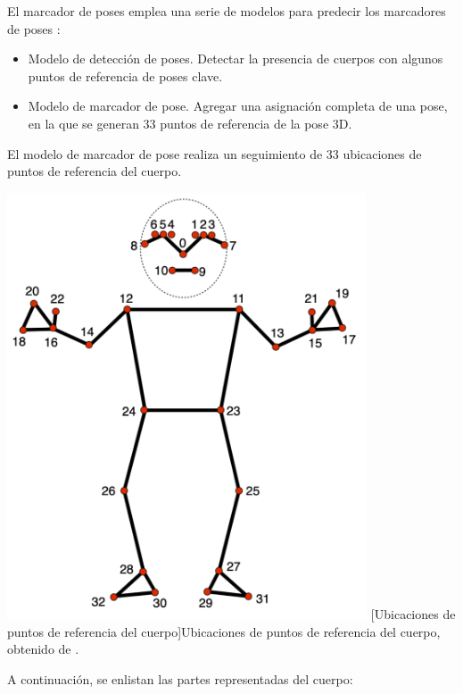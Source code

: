 El marcador de poses emplea una serie de modelos para predecir los marcadores de poses \cite{ref53}:
\begin{itemize}

    \item Modelo de detección de poses. Detectar la presencia de cuerpos con algunos puntos de referencia de poses clave.
    \item Modelo de marcador de pose. Agregar una asignación completa de una pose, en la que se generan 33 puntos de referencia de la pose 3D.

\end{itemize}
El modelo de marcador de pose realiza un seguimiento de 33 ubicaciones de puntos de referencia del cuerpo.
\begin{center}
    \includegraphics[width=0.8\textwidth]{Images/Cap 2/MediaPipe_Pose.png}
    [Ubicaciones de puntos de referencia del cuerpo]{Ubicaciones de puntos de referencia del cuerpo, obtenido de \cite{ref53}.}  %
\end{center}

A continuación, se enlistan las partes representadas del cuerpo:

